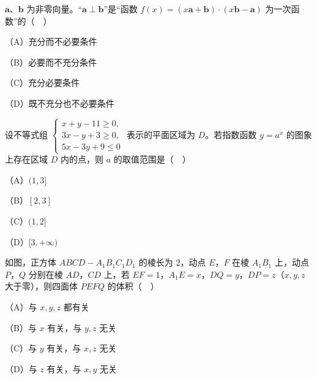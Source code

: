\begin{question}
$\boldsymbol a$、$\boldsymbol b$ 为非零向量。“$\boldsymbol a\perp\boldsymbol b$”是“函数 $f(x)=(x\boldsymbol a+\boldsymbol b)\cdot(x\boldsymbol b-\boldsymbol a)$ 为一次函数”的（　）

（A）充分而不必要条件

（B）必要而不充分条件

（C）充分必要条件

（D）既不充分也不必要条件

\end{question}
\begin{question}
设不等式组 $\begin{cases}x+y-11\geqslant0,\\ 3x-y+3\geqslant0,\\ 5x-3y+9\leqslant0\end{cases}$ 表示的平面区域为 $D$。若指数函数 $y=a^x$ 的图象上存在区域 $D$ 内的点，则 $a$ 的取值范围是（　）

（A）$(1,3]$

（B）$[2,3]$

（C）$(1,2]$

（D）$[3,+\infty)$

\Needspace{0.4\textheight}
\end{question}
\begingroup
\renewenvironment{question}{\Needspace{0.5\textheight}}{}
\begin{question}
如图，正方体 $ABCD-A_1B_1C_1D_1$ 的棱长为 $2$，动点 $E$，$F$ 在棱 $A_1B_1$ 上，动点 $P$，$Q$ 分别在棱 $AD$，$CD$ 上，若 $EF=1$，$A_1E=x$，$DQ=y$，$DP=z$（$x,y,z$ 大于零），则四面体 $PEFQ$ 的体积（　）

（A）与 $x,y,z$ 都有关

（B）与 $x$ 有关，与 $y,z$ 无关

（C）与 $y$ 有关，与 $x,z$ 无关

（D）与 $z$ 有关，与 $x,y$ 无关
\nopagebreak[4]
\begin{center}\end{center}
\nopagebreak[4]
\end{question}
\endgroup
{}

